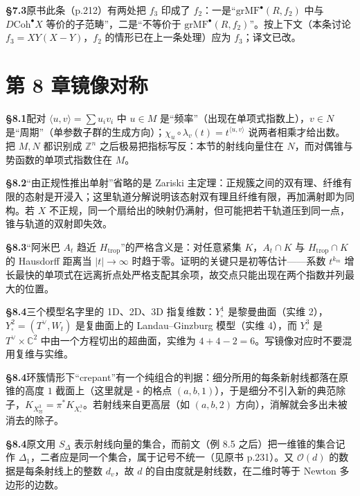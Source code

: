 \noindent\textbf{§7.3}\quad 原书此条（p.212）有两处把 $f_3$ 印成了 $f_2$：一是“$\mathrm{grMF}^{\bullet}(R,f_2)$ 中与 $D\mathrm{Coh}^{\bullet}X$ 等价的子范畴”，二是“不等价于 $\mathrm{grMF}^{\bullet}(R,f_2)$”。按上下文（本条讨论 $f_3=XY(X-Y)$，$f_2$ 的情形已在上一条处理）应为 $f_3$；译文已改。\par\medskip
\section*{第 8 章\quad 镜像对称}
\noindent\textbf{§8.1}\quad 配对 $\langle u,v\rangle=\sum u_iv_i$ 中 $u\in M$ 是“频率”（出现在单项式指数上），$v\in N$ 是“周期”（单参数子群的生成方向）；$\chi_u\circ\lambda_v(t)=t^{\langle u,v\rangle}$ 说两者相乘才给出数。把 $M,N$ 都识别成 $\mathbb Z^n$ 之后极易把指标写反：本节的射线向量住在 $N$，而对偶锥与势函数的单项式指数住在 $M$。\par\medskip
\noindent\textbf{§8.2}\quad “由正规性推出单射”省略的是 Zariski 主定理：正规簇之间的双有理、纤维有限的态射是开浸入；这里轨道分解说明该态射双有理且纤维有限，再加满射即为同构。若 $X$ 不正规，同一个扇给出的映射仍满射，但可能把若干轨道压到同一点，锥与轨道的双射即失效。\par\medskip
\noindent\textbf{§8.3}\quad “阿米巴 $A_t$ 趋近 $H_{\mathrm{trop}}$”的严格含义是：对任意紧集 $K$，$A_t\cap K$ 与 $H_{\mathrm{trop}}\cap K$ 的 Hausdorff 距离当 $|t|\to\infty$ 时趋于零。证明的关键只是初等估计——系数 $t^{k_m}$ 增长最快的单项式在远离折点处严格支配其余项，故交点只能出现在两个指数并列最大的位置。\par\medskip
\noindent\textbf{§8.4}\quad 三个模型名字里的 1D、2D、3D 指复维数：$Y^1_\square$ 是黎曼曲面（实维 2），$Y^2_\square=(T^\vee,W_t)$ 是复曲面上的 Landau--Ginzburg 模型（实维 4），而 $Y^3_\square$ 是 $T^\vee\times\mathbb C^2$ 中由一个方程切出的超曲面，实维为 $4+4-2=6$。写镜像对应时不要混用复维与实维。\par\medskip
\noindent\textbf{§8.4}\quad 环簇情形下“crepant”有一个纯组合的判据：细分所用的每条新射线都落在原锥的高度 $1$ 截面上（这里就是 $\square$ 的格点 $(a,b,1)$），于是细分不引入新的典范除子，$K_{X^3_\boxtimes}=\pi^*K_{X^3_\square}$。若射线来自更高层（如 $(a,b,2)$ 方向），消解就会多出未被消去的除子。\par\medskip
\noindent\textbf{§8.4}\quad 原文用 $S_\Delta$ 表示射线向量的集合，而前文（例 8.5 之后）把一维锥的集合记作 $\Delta_1$，二者应是同一个集合，属于记号不统一（见原书 p.231）。又 $\mathcal O(d)$ 的数据是每条射线上的整数 $d_v$，故 $d$ 的自由度就是射线数，在二维时等于 Newton 多边形的边数。\par\medskip

